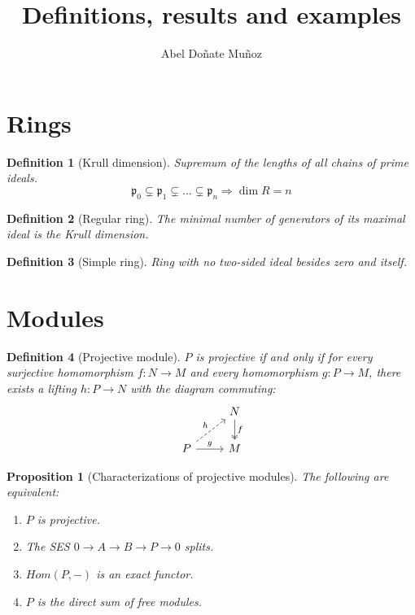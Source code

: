 \documentclass[leqno]{article}
\title{Definitions, results and examples}
\author{Abel Doñate Muñoz}
\date{}
\newtheorem{proposition}{Proposition}
\newtheorem{definition}{Definition}
\begin{document}
\maketitle
\tableofcontents
\newpage

\section{Rings}
\begin{definition}[Krull dimension] Supremum of the lengths of all chains of prime ideals. \[
\mathfrak{p}_0 \subsetneq \mathfrak{p}_1 \subsetneq \ldots \subsetneq \mathfrak{p}_n  \Rightarrow \dim R = n
\] 

\end{definition}

\begin{definition}[Regular ring] The minimal number of generators of its maximal ideal is the Krull dimension.

\end{definition}

\begin{definition}[Simple ring] Ring with no two-sided ideal besides zero and itself.
\end{definition}


\section{Modules}
\begin{definition}[Projective module] $P$ is projective if and only if for every surjective homomorphism $f:N\to M$ and every homomorphism $g:P\to M$, there exists a lifting $h:P\to N$ with the diagram commuting:
\[\begin{tikzcd}
	& N \\
	P & M
	\arrow["f", two heads, from=1-2, to=2-2]
	\arrow["g", from=2-1, to=2-2]
	\arrow["h", dashed, from=2-1, to=1-2]
\end{tikzcd}\]
\end{definition}

\begin{proposition}[Characterizations of projective modules] The following are equivalent:
\begin{enumerate}[topsep=-6pt, itemsep=0pt]
  \item $P$ is projective.
  \item The SES $0\to A \to B\to P\to 0$ splits.
  \item $Hom(P, -)$ is an exact functor.
  \item $P$ is the direct sum of free modules.
\end{enumerate}
\end{proposition}
\end{document}
